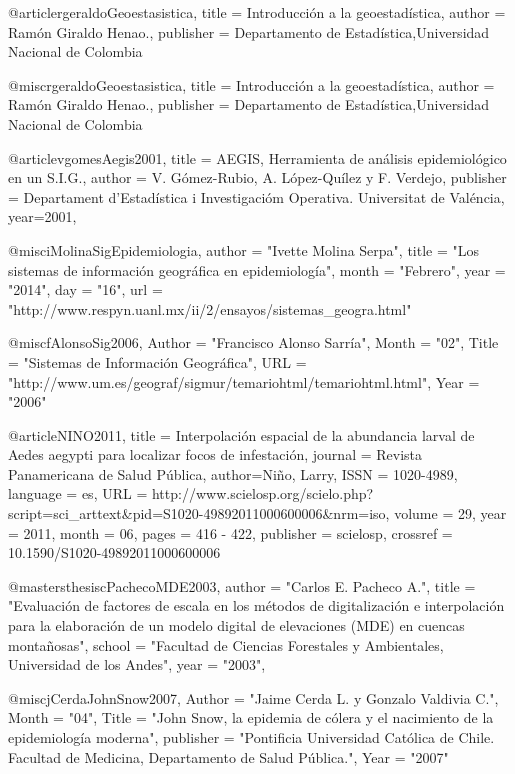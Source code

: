 @article{rgeraldoGeoestasistica,
  title = {Introducción a la geoestadística},
  author = {Ramón Giraldo Henao.},
  publisher = {Departamento de Estadística,Universidad Nacional de Colombia}
}

@misc{rgeraldoGeoestasistica,
  title = {Introducción a la geoestadística},
  author = {Ramón Giraldo Henao.},
  publisher = {Departamento de Estadística,Universidad Nacional de Colombia}
}

@article{vgomesAegis2001,
  title = {AEGIS, Herramienta de análisis epidemiológico en un S.I.G.},
  author = {V. Gómez-Rubio, A. López-Quílez y F. Verdejo},
  publisher = {Departament d’Estadística i Investigacióm Operativa. Universitat de Valéncia},
  year={2001},
}

@misc{iMolinaSigEpidemiologia,
      author = "Ivette Molina Serpa",
      title = "Los sistemas de información geográfica en epidemiología",
      month = "Febrero",
      year = "2014",
      day = "16",
      url = "http://www.respyn.uanl.mx/ii/2/ensayos/sistemas_geogra.html"
}

@misc{fAlonsoSig2006,
    Author = "Francisco Alonso Sarría",
    Month = "02",
    Title = "Sistemas de Información Geográfica",
    URL = "http://www.um.es/geograf/sigmur/temariohtml/temariohtml.html",
    Year = "2006"
}



@article{NINO2011,
   title = {Interpolación espacial de la abundancia larval de Aedes aegypti para localizar focos de infestación},
   journal = {Revista Panamericana de Salud Pública},
   author={Niño, Larry},
   ISSN = {1020-4989},
   language = {es},
   URL = {http://www.scielosp.org/scielo.php?script=sci_arttext&pid=S1020-49892011000600006&nrm=iso},
   volume = {29},
   year = {2011},
   month = {06},
   pages = {416 - 422},
   publisher = {scielosp},
   crossref = {10.1590/S1020-49892011000600006}
}

@mastersthesis{cPachecoMDE2003,
    author    = "Carlos E. Pacheco A.",
    title     = "Evaluación de factores de escala en los métodos de digitalización e interpolación para la elaboración de un modelo digital de elevaciones (MDE) en cuencas montañosas",
    school    = "Facultad de Ciencias Forestales y Ambientales, Universidad de los Andes",
    year      = "2003",
}

@misc{jCerdaJohnSnow2007,
    Author = "Jaime Cerda L. y Gonzalo Valdivia C.",
    Month = "04",
    Title = "John Snow, la epidemia de cólera y el nacimiento de la epidemiología moderna",
    publisher = "Pontificia Universidad Católica de Chile. Facultad de Medicina, Departamento de Salud Pública.",
    Year = "2007"
}
